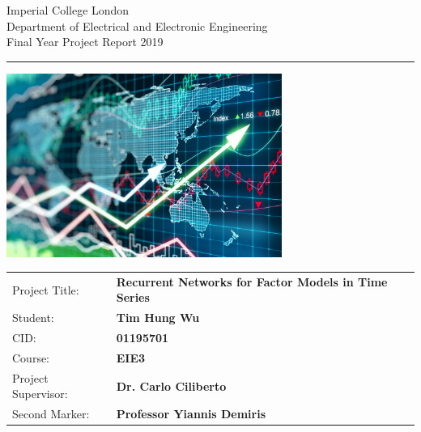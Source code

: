 \documentclass[10pt,onecolumn,letterpaper]{article}
\begin{document}
\begin{titlepage}
                \setlength{\parindent}{0pt}
                \setlength{\parskip}{0pt}

                {
                                \Large
                                \raggedright
                                Imperial College London\\[17pt]
                                Department of Electrical and Electronic Engineering\\[17pt]
                                Final Year Project Report 2019\\[17pt]
                }

                \rule{\columnwidth}{3pt}
                \vfill
                \centering
                  \includegraphics[width=0.7\columnwidth,height=60mm,keepaspectratio]{logo.png}
                \vfill
                \setlength{\tabcolsep}{0pt}
                \begin{tabular}{p{40mm}p{\dimexpr\columnwidth-40mm}}
                      	Project Title: & \textbf{Recurrent Networks for Factor Models in Time Series} \\[12pt]
                       	Student: & \textbf{Tim Hung Wu} \\[12pt]
                        	CID: & \textbf{01195701} \\[12pt]
                	    	Course: & \textbf{EIE3} \\[12pt]
                        	Project Supervisor: & \textbf{Dr. Carlo Ciliberto} \\[12pt]
          		Second Marker: & \textbf{Professor Yiannis Demiris} \\[12pt]
                \end{tabular}
\end{titlepage}
\end{document}
